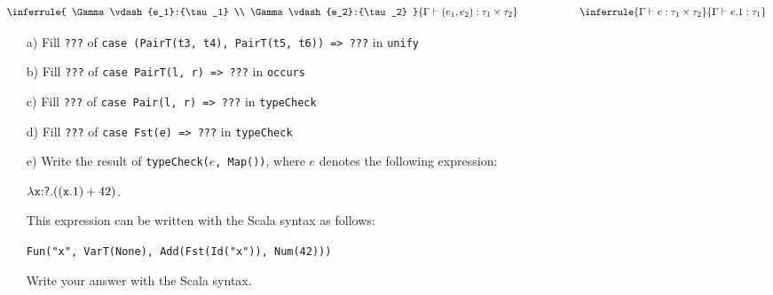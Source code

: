 \begin{enumerate}
\[
\inferrule
{ \Gamma\vdash{e_1}:{\tau_1} \\ \Gamma\vdash{e_2}:{\tau_2} }
{ \Gamma\vdash{(e_1,e_2)}:{\tau_1\times\tau_2} }
\qquad\qquad\qquad
\inferrule
{ \Gamma\vdash{e}:{\tau_1\times\tau_2} }
{ \Gamma\vdash{e{\textsf{.}1}}:{\tau_1} }
\]

\begin{enumerate}
  \item[a)] 
    Fill \texttt{???} of \texttt{case (PairT(t3, t4), PairT(t5, t6)) => ???} in \texttt{unify}
  \item[b)] 
    Fill \texttt{???} of \texttt{case PairT(l, r) => ???} in \texttt{occurs}
  \item[c)] 
    Fill \texttt{???} of \texttt{case Pair(l, r) => ???} in \texttt{typeCheck}
  \item[d)] 
    Fill \texttt{???} of \texttt{case Fst(e) => ???} in \texttt{typeCheck}
  \item[e)] 
    Write the result of \texttt{typeCheck($e$, Map())}, where $e$ denotes
    the following expression:

    $\lambda\texttt{x}{:}{\textsf{?}}.((\texttt{x}{\textsf{.}1})+42)$.

    This expression can be written with the Scala syntax as follows:

    \verb+Fun("x", VarT(None), Add(Fst(Id("x")), Num(42)))+

    Write your answer with the Scala syntax.
\end{enumerate}


\end{enumerate}
